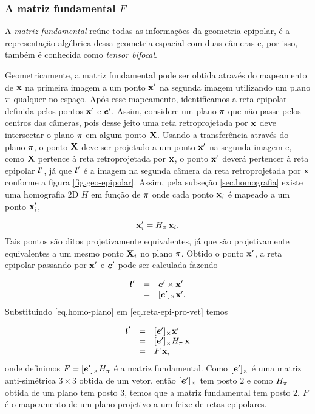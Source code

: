 \subsubsection{A matriz fundamental $F$}\label{sec.matriz-F}

A \textit{matriz fundamental} reúne todas as informações da geometria epipolar, é a representação algébrica dessa geometria espacial com duas câmeras e, por isso, também é conhecida como \textit{tensor bifocal}. 

Geometricamente, a matriz fundamental pode ser obtida através do mapeamento de $\mathbf{x}$ na primeira imagem a um ponto $\mathbf{x}'$ na segunda imagem utilizando um plano $\pi$ qualquer no espaço. Após esse mapeamento, identificamos a reta epipolar definida pelos pontos $\mathbf{x}'$ e $\boldsymbol{e}'$. Assim, considere um plano $\pi$ que não passe pelos centros das câmeras, pois desse jeito uma reta retroprojetada por $\mathbf{x}$ deve intersectar o plano $\pi$ em algum ponto $\mathbf{X}$. Usando a transferência através do plano $\pi$, o ponto $\mathbf{X}$ deve ser projetado a um ponto $\mathbf{x}'$ na segunda imagem e, como $\mathbf{X}$ pertence à reta retroprojetada por $\mathbf{x}$, o ponto $\mathbf{x}'$ deverá pertencer à reta epipolar $\boldsymbol{l}'$, já que $\boldsymbol{l}'$ é a imagem na segunda câmera da reta retroprojetada por $\mathbf{x}$ conforme a figura \ref{fig.geo-epipolar}. Assim, pela subseção \ref{sec.homografia} existe uma homografia 2D $H$ em função de $\pi$ onde cada ponto $\mathbf{x}_i$ é mapeado a um ponto $\mathbf{x}_i'$, 

\begin{equation}\label{eq.homo-plano}
\mathbf{x}'_i= H_{\pi} \,\mathbf{x}_i.
\end{equation}
Tais pontos são ditos projetivamente equivalentes, já que são projetivamente equivalentes a um mesmo ponto $\mathbf{X}_i$ no plano $\pi$. Obtido o ponto $\mathbf{x}'$, a reta epipolar passando por $\mathbf{x}'$ e $\boldsymbol{e}'$ pode ser calculada fazendo 

\begin{equation}\label{eq.reta-epi-pro-vet}
\begin{array}{rcl}
\boldsymbol{l}'&=&\boldsymbol{e}'\times\mathbf{x}'\\
&=&[\boldsymbol{e}']_\times\mathbf{x}'.
\end{array}
\end{equation}
Substituindo \ref{eq.homo-plano} em \ref{eq.reta-epi-pro-vet} temos

\begin{equation*}
\begin{array}{rcl}
\boldsymbol{l}'&=&[\boldsymbol{e}']_\times\mathbf{x}'\\
&=&[\boldsymbol{e}']_\times H_{\pi} \,\mathbf{x}\\
&=&F\,\mathbf{x},
\end{array}
\end{equation*} 
onde definimos $F=[\boldsymbol{e}']_\times H_{\pi}$ é a matriz fundamental. Como $[\boldsymbol{e}']_\times$ é uma matriz anti-simétrica $3\times3$ obtida de um vetor, então  $[\boldsymbol{e}']_\times$ tem posto $2$ e como $H_{\pi}$ obtida de um plano tem posto $3$, temos que a matriz fundamental tem posto $2$. $F$ é o mapeamento de um plano projetivo a um feixe de retas epipolares.


